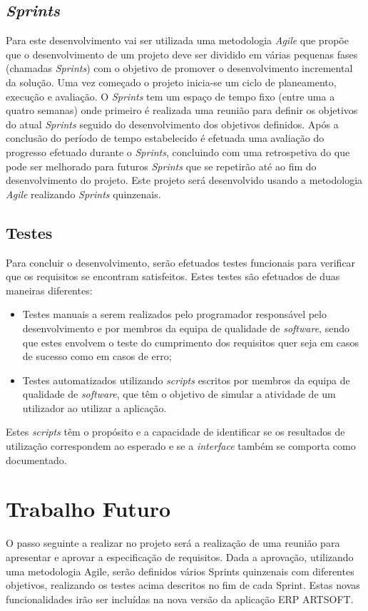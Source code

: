 \documentclass[sigplan]{acmart}
\begin{document}
\subsection{\textit{Sprints}}

Para este desenvolvimento vai ser utilizada uma metodologia \textit{Agile} que propõe que o desenvolvimento de um projeto deve ser dividido em várias pequenas fases (chamadas \textit{Sprints}) com o objetivo de promover o desenvolvimento incremental da solução. Uma vez começado o projeto inicia-se um ciclo de planeamento, execução e avaliação. O \textit{Sprints} tem um espaço de tempo fixo (entre uma a quatro semanas) onde primeiro é realizada uma reunião para definir os objetivos do atual \textit{Sprints} seguido do desenvolvimento dos objetivos definidos. Após a conclusão do período de tempo estabelecido é efetuada uma avaliação do progresso efetuado durante o \textit{Sprints}, concluindo com uma retrospetiva do que pode ser melhorado para futuros \textit{Sprints} que se repetirão até ao fim do desenvolvimento do projeto. Este projeto será desenvolvido usando a metodologia \textit{Agile} realizando \textit{Sprints} quinzenais.

\subsection{Testes}

Para concluir o desenvolvimento, serão efetuados testes funcionais para verificar que os requisitos se encontram satisfeitos. Estes testes são efetuados de duas maneiras diferentes:
\begin{itemize}
  \item Testes manuais a serem realizados pelo programador responsável pelo desenvolvimento e por membros da equipa de qualidade de \textit{software}, sendo que estes envolvem o teste do cumprimento dos requisitos quer seja em casos de sucesso como em casos de erro;
  \item Testes automatizados utilizando \textit{scripts} escritos por membros da equipa de qualidade de \textit{software}, que têm o objetivo de simular a atividade de um utilizador ao utilizar a aplicação.
\end{itemize}
Estes \textit{scripts} têm o propósito e a capacidade de identificar se os resultados de utilização correspondem ao esperado e se a \textit{interface} também se comporta como documentado.

\section{Trabalho Futuro} \label{sec:forthcomingwork}

O passo seguinte a realizar no projeto será a realização de uma reunião para apresentar e aprovar a especificação de requisitos. Dada a aprovação, utilizando uma metodologia Agile, serão definidos vários Sprints quinzenais com diferentes objetivos, realizando os testes acima descritos no fim de cada Sprint. Estas novas funcionalidades irão ser incluídas na nova versão da aplicação ERP ARTSOFT.



\end{document}
